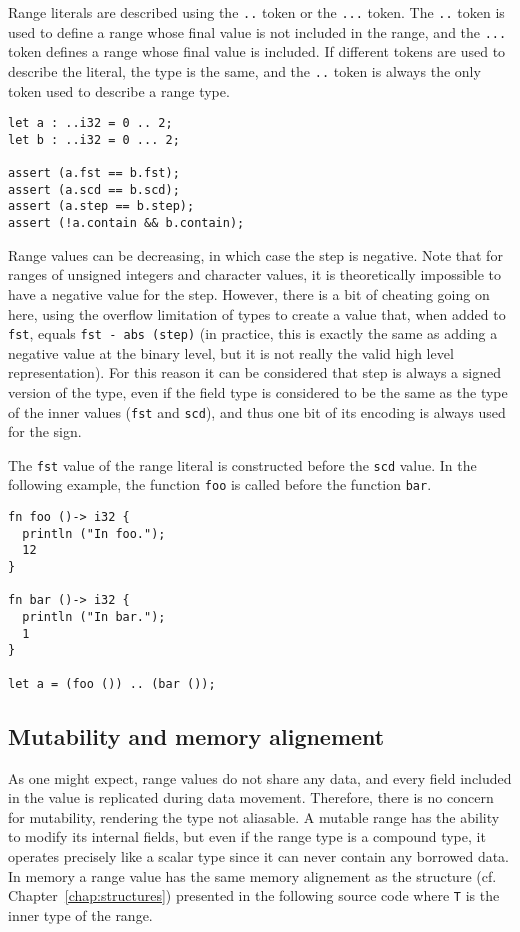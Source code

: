 Range literals are described using the \texttt{..} token or the \texttt{...}
token. The \texttt{..} token is used to define a range whose final value is not
included in the range, and the \texttt{...} token defines a range whose final
value is included. If different tokens are used to describe the literal, the
type is the same, and the \texttt{..} token is always the only token used to
describe a range type.

\begin{lstlisting}[style=coloredverbatim]
let a : ..i32 = 0 .. 2;
let b : ..i32 = 0 ... 2;

assert (a.fst == b.fst);
assert (a.scd == b.scd);
assert (a.step == b.step);
assert (!a.contain && b.contain);
\end{lstlisting}

Range values can be decreasing, in which case the step is negative. Note that
for ranges of unsigned integers and character values, it is theoretically
impossible to have a negative value for the step. However, there is a bit of
cheating going on here, using the overflow limitation of types to create a value
that, when added to \texttt{fst}, equals \texttt{fst - abs (step)} (in practice,
this is exactly the same as adding a negative value at the binary level, but it
is not really the valid high level representation). For this reason it can be
considered that step is always a signed version of the type, even if the field
type is considered to be the same as the type of the inner values (\texttt{fst}
and \texttt{scd}), and thus one bit of its encoding is always used for the sign.
\smallskip

The \texttt{fst} value of the range literal is constructed before the
\texttt{scd} value. In the following example, the function \texttt{foo} is
called before the function \texttt{bar}.

\begin{lstlisting}[style=coloredverbatim]
fn foo ()-> i32 {
  println ("In foo.");
  12
}

fn bar ()-> i32 {
  println ("In bar.");
  1
}

let a = (foo ()) .. (bar ());
\end{lstlisting}

\subsection {Mutability and memory alignement}

As one might expect, range values do not share any data, and every field
included in the value is replicated during data movement. Therefore, there is no
concern for mutability, rendering the type not aliasable. A mutable range has
the ability to modify its internal fields, but even if the range type is a
compound type, it operates precisely like a scalar type since it can never
contain any borrowed data. In memory a range value has the same memory
alignement as the structure (cf. Chapter~\ref{chap:structures}) presented in the
following source code where \texttt{T} is the inner type of the range.

